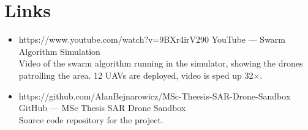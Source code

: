 

\section{Links}

\begin{itemize}
    \item {https://www.youtube.com/watch?v=9BXr4irV290}
    {YouTube — Swarm Algorithm Simulation} \\
    \small Video of the swarm algorithm running in the simulator, showing the drones patrolling the area. 12 UAVs are deployed, video is sped up 32×.

    \item {https://github.com/AlanBejnarowicz/MSc-Theesis-SAR-Drone-Sandbox}
    {GitHub — MSc Thesis SAR Drone Sandbox} \\
    \small Source code repository for the project.
\end{itemize}